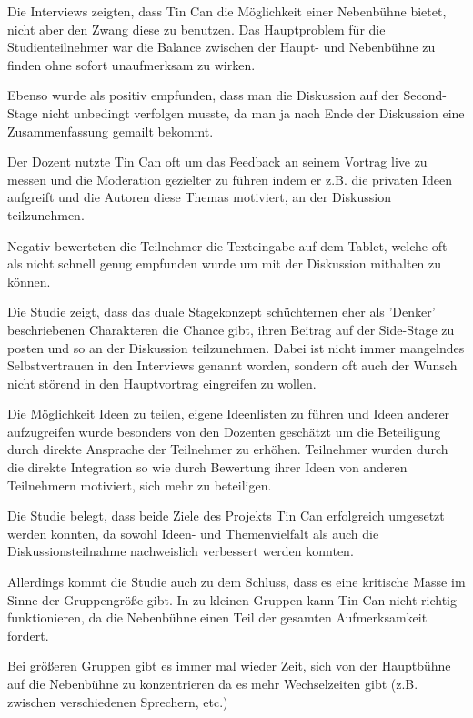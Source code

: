 Die Interviews zeigten, dass Tin Can die Möglichkeit einer Nebenbühne bietet,
nicht aber den Zwang diese zu benutzen. Das Hauptproblem für die
Studienteilnehmer war die Balance zwischen der Haupt- und Nebenbühne zu finden
ohne sofort unaufmerksam zu wirken.

Ebenso wurde als positiv empfunden, dass man die Diskussion auf der Second-Stage
nicht unbedingt verfolgen musste, da man ja nach Ende der Diskussion eine
Zusammenfassung gemailt bekommt.

Der Dozent nutzte Tin Can oft um das Feedback an seinem Vortrag live zu messen
und die Moderation gezielter zu führen indem er z.B. die privaten Ideen
aufgreift und die Autoren diese Themas motiviert, an der Diskussion teilzunehmen.

Negativ bewerteten die Teilnehmer die Texteingabe auf dem Tablet, welche oft
als nicht schnell genug empfunden wurde um mit der Diskussion mithalten zu können.

Die Studie\cite{HarGorSch2012} zeigt, dass das duale Stagekonzept schüchternen eher als 'Denker'
beschriebenen Charakteren die Chance gibt, ihren Beitrag auf der Side-Stage zu
posten und so an der Diskussion teilzunehmen. Dabei ist nicht immer mangelndes
Selbstvertrauen in den Interviews genannt worden, sondern oft auch der Wunsch
nicht störend in den Hauptvortrag eingreifen zu wollen.

Die Möglichkeit Ideen zu teilen, eigene Ideenlisten zu füh\-ren und Ideen
anderer aufzugreifen wurde besonders von den Dozenten geschätzt um die Beteiligung durch
direkte Ansprache der Teilnehmer zu erhöhen. Teilnehmer wurden durch die direkte
Integration so wie durch Bewertung ihrer Ideen von anderen Teilnehmern
motiviert, sich mehr zu beteiligen.

Die Studie\cite{HarGorSch2012} belegt, dass beide Ziele des Projekts Tin Can erfolgreich umgesetzt
werden konnten, da sowohl Ideen- und Themenvielfalt als auch die
Diskussionsteilnahme nachweislich verbessert werden konnten.

Allerdings kommt die Studie\cite{HarGorSch2012} auch zu dem Schluss, dass es eine kritische Masse im
Sinne der Gruppengröße gibt. In zu kleinen Gruppen kann Tin Can nicht richtig
funktionieren, da die Nebenbühne einen Teil der gesamten Aufmerksamkeit fordert.

Bei größeren Gruppen gibt es immer mal wieder Zeit, sich von der Hauptbühne auf
die Nebenbühne zu konzentrieren da es mehr Wechselzeiten gibt (z.B. zwischen
verschiedenen Sprechern, etc.)





